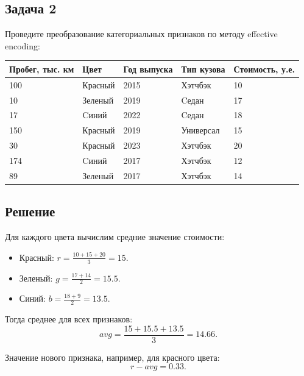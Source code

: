 \subsection*{Задача 2}

Проведите преобразование категориальных признаков по методу effective encoding:
\begin{table}[ht]
	\footnotesize
	\begin{tabular}{lllll}
		\hline
		Пробег, тыс. км & Цвет    & Год выпуска & Тип кузова & Стоимость, у.е. \\ \hline
		100             & Красный & 2015        & Хэтчбэк    & 10           \\
		10              & Зеленый & 2019        & Cедан      & 17           \\
		17              & Cиний   & 2022        & Cедан      & 18           \\
		150             & Красный & 2019        & Универсал  & 15           \\
		30              & Красный & 2023        & Хэтчбэк    & 20           \\
		174             & Cиний   & 2017        & Хэтчбэк    & 12           \\
		89              & Зеленый & 2017        & Хэтчбэк    & 14           \\ \hline
	\end{tabular}
\end{table}

\subsection*{Решение}

Для каждого цвета вычислим средние значение стоимости:
\begin{itemize}
	\item Красный: $r = \frac{10+15+20}{3}=15$.
	\item Зеленый: $g = \frac{17+14}{2}=15.5$.
	\item Синий: $b = \frac{18+9}{2}=13.5$.
\end{itemize}

Тогда среднее для всех признаков:
$$ avg = \frac{15 + 15.5 + 13.5}{3} = 14.66. $$

Значение нового признака, например, для красного цвета:
$$ r - avg = 0.33. $$

